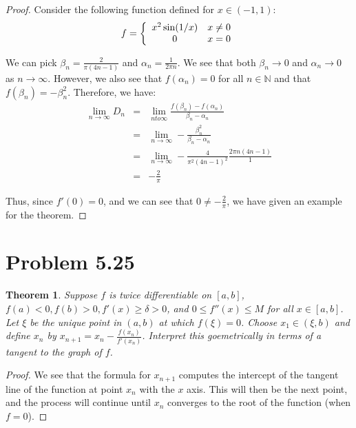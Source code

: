 \documentclass[psamsfonts]{amsart}
\newtheorem{thm}{Theorem}[section]
\theoremstyle{definition}
\theoremstyle{remark}
\numberwithin{equation}{section}
\begin{document}
\begin{proof}
Consider the following function defined for $x \in (-1,1)$:
\begin{equation}
f = \left\{ \begin{array}{c l}
x^2 \sin (1/x) & x \neq 0 \\
0 & x = 0
\end{array} \right.
\end{equation}

We can pick $\beta_n = \frac{2}{\pi (4n - 1)}$ and $\alpha_n = \frac{1}{2\pi n}$. We see that both $\beta_n \to 0$ and $\alpha_n \to 0$ as $n \to \infty$. However, we also see that $f(\alpha_n) = 0$ for all $n \in \mathbb{N}$ and that $f(\beta_n) = - \beta_n^2$. Therefore, we have:
\begin{eqnarray}
\lim_{n \to \infty} D_n &=& \lim_{n to \infty} \frac{f(\beta_n) - f(\alpha_n)}{\beta_n - \alpha_n} \\
&=& \lim_{n \to \infty} -\frac{\beta_n^2}{\beta_n - \alpha_n} \\
&=& \lim_{n \to \infty} - \frac{4}{\pi^2 (4n-1)^2} \frac{2\pi n (4n -1)}{1} \\
&=& -\frac{2}{\pi}
\end{eqnarray}

Thus, since $f'(0) = 0$, and we can see that $0 \neq -\frac{2}{\pi}$, we have given an example for the theorem.
\end{proof}

\section{Problem 5.25}

\begin{thm}
Suppose $f$ is twice differentiable on $[a,b]$, $f(a) < 0, f(b) > 0, f'(x) \geq \delta > 0$, and $0 \leq f''(x) \leq M$ for all $x \in [a,b]$. Let $\xi$ be the unique point in $(a,b)$ at which $f(\xi) = 0$. Choose $x_1 \in (\xi,b)$ and define $x_n$ by $x_{n+1} = x_n - \frac{f(x_n)}{f'(x_n)}$. Interpret this goemetrically in terms of a tangent to the graph of $f$.
\end{thm}

\begin{proof}
We see that the formula for $x_{n+1}$ computes the intercept of the tangent line of the function at point $x_n$ with the $x$ axis. This will then be the next point, and the process will continue until $x_n$ converges to the root of the function (when $f = 0$).  
\end{proof}
\end{document}
